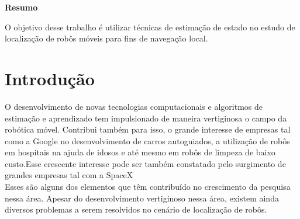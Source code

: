 \documentclass[a0,portrait]{a0poster}
\begin{document}
\begin{multicols}{1} %


\color{Navy} %

\begin{center}
\textbf{Resumo}
\end{center}
O objetivo desse trabalho é utilizar técnicas de estimação de estado  no estudo de localização de robôs móveis para fins de navegação local.




\color{SaddleBrown} %

\section*{Introdução}

O desenvolvimento de novas tecnologias computacionais e algoritmos de estimação e aprendizado tem impulsionado de maneira vertiginosa o campo da robótica móvel. Contribui também para isso, o grande interesse de empresas tal como a Google no desenvolvimento de carros autoguiados, a utilização de robôs em hospitais na ajuda de idosos e  até mesmo em robôs de limpeza de baixo custo.Esse crescente interesse pode ser também constatado pelo surgimento de grandes empresas tal com a SpaceX\\
Esses são alguns dos elementos que têm contribuído no crescimento da pesquisa nessa área.  Apesar do desenvolvimento vertiginoso nessa área, existem ainda diversos problemas a serem resolvidos no cenário de localização de robôs.   \\





\color{DarkSlateGray} %


\end{multicols}
\end{document}
